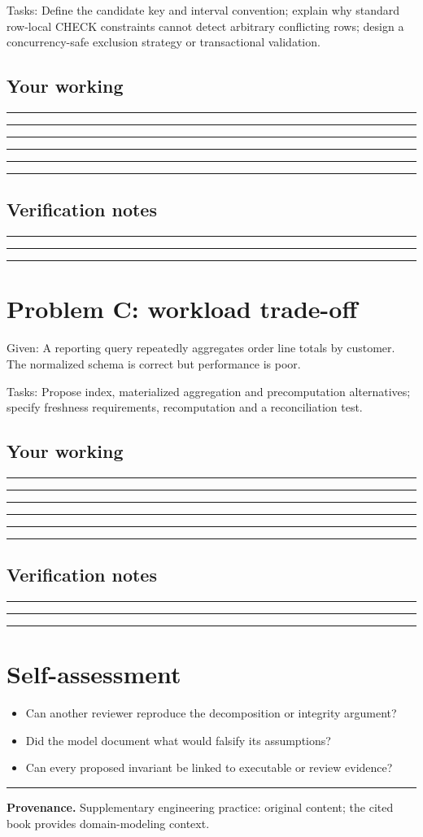 \documentclass[11pt,letterpaper]{article}
\newcommand{\ResponseLine}{\par\vspace{1.05em}\noindent\rule{\linewidth}{0.4pt}\par}
\newcommand{\ResponseArea}{\ResponseLine\ResponseLine\ResponseLine}
\begin{document}
Tasks: Define the candidate key and interval convention; explain why standard row-local CHECK constraints cannot detect arbitrary conflicting rows; design a concurrency-safe exclusion strategy or transactional validation.

\subsection{Your working}
\ResponseArea\ResponseArea
\subsection{Verification notes}
\ResponseArea

\section{Problem C: workload trade-off}
Given: A reporting query repeatedly aggregates order line totals by customer. The normalized schema is correct but performance is poor.

Tasks: Propose index, materialized aggregation and precomputation alternatives; specify freshness requirements, recomputation and a reconciliation test.

\subsection{Your working}
\ResponseArea\ResponseArea
\subsection{Verification notes}
\ResponseArea

\section{Self-assessment}
\begin{itemize}
\item Can another reviewer reproduce the decomposition or integrity argument?
\item Did the model document what would falsify its assumptions?
\item Can every proposed invariant be linked to executable or review evidence?
\end{itemize}

\vfill
\hrule
{\footnotesize\textbf{Provenance.} Supplementary engineering practice: original content; the cited book provides domain-modeling context.}
\end{document}
